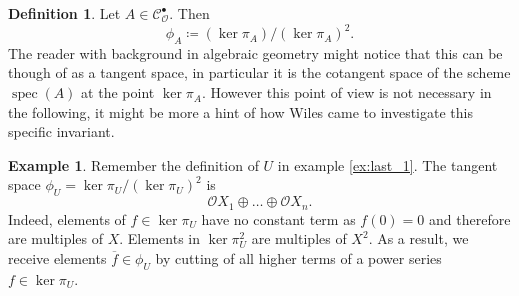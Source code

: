 \documentclass{article}
\theoremstyle{plain}%
\theoremstyle{definition}
\newtheorem{definition}{Definition}[section]
\newtheorem{example}{Example}[section]
\theoremstyle{remark}
\newcommand{\cob}{\mathcal{C}_\mathcal{O}^\bullet}
\begin{document}
    \begin{definition}
        Let \(A \in \cob\). Then
        \[\phi_A \coloneqq (\ker \pi_A)/(\ker \pi_A)^2.\]
        The reader with background in algebraic geometry might notice that this can be though of as a tangent space, 
        in particular it is the cotangent space of the scheme \(\operatorname{spec}(A)\) at the point \(\ker \pi_A\).
        However this point of view is not necessary in the following, 
        it might be more a hint of how Wiles came to investigate this specific invariant.
    \end{definition}

    \begin{example}\label{ex:last_phi}
        Remember the definition of \(U\) in example \ref{ex:last_1}.
        The tangent space \(\phi_U = \ker \pi_U/(\ker \pi_U)^2\) is
        \[
            \mathcal{O}X_1 \oplus \dots \oplus \mathcal{O}X_n.
        \]
        Indeed, elements of \(f \in \ker \pi_U\) have no constant term as \(f(0) = 0\) and therefore are multiples of \(X\).
        Elements in \(\ker \pi_U^2\) are multiples of \(X^2\). As a result, we receive elements \(\overline{f} \in \phi_U\) by
        cutting of all higher terms of a power series \(f \in \ker \pi_U\).
    \end{example}
\end{document}

